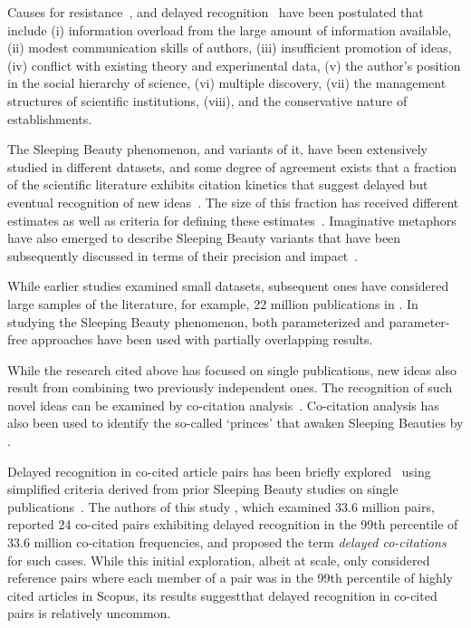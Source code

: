 \documentclass[utf8]{frontiersSCNS}
\begin{document}
Causes for resistance~\citep{Barber1961,Cole1970}, and delayed recognition~\citep{Garfield1970a,Garfield1980a} have been postulated  that include (i) information overload from the large amount of information available, (ii)  modest communication skills of authors, (iii) insufficient promotion of ideas, (iv) conflict with existing theory and experimental data, (v) the author's position in the social hierarchy of science, (vi)  multiple discovery, (vii) the management structures of scientific institutions, (viii), and the conservative nature of establishments. 

The Sleeping Beauty phenomenon, and variants of it, have been extensively studied in different datasets, and some degree of agreement exists that a fraction of the scientific literature exhibits citation kinetics that suggest delayed but eventual recognition of new ideas~\citep{Glanzel2003,redner_2005,Braun_2010,Li2014}. The size of this fraction has received different estimates as well as criteria for defining these estimates~\citep{Glanzel2004,Ke2015,Li2016,Raan2019}. Imaginative metaphors have also emerged to describe Sleeping Beauty variants that have been subsequently discussed in terms of their precision and impact~\citep{sugimoto_mostafa_2018}. 



While earlier studies examined small datasets, subsequent ones have considered large samples of the literature, for example, 22 million publications in \cite{Ke2015}. In studying the Sleeping Beauty phenomenon, both parameterized and parameter-free approaches have been used \citep{Raan2004, li_2014,Ke2015,costas2010,ye_bornmann_2018} with partially overlapping results.

While the research cited above has focused on single publications, new ideas also result from combining two previously independent ones. The recognition of such novel ideas can be examined by co-citation analysis~\citep{MarshakovaShaikevich1973,Uzzi2013,Boyack2014,Wang2017,Bradley2020}.  Co-citation analysis has also been used to identify the so-called `princes' that awaken Sleeping Beauties by \citep{zong_2018,teixeira2017sleeping} . 

Delayed recognition in co-cited article pairs has been briefly explored~\citep{devarakonda_2020} using simplified criteria derived from prior Sleeping Beauty studies on single publications~\citep{Ke2015,Raan2004,Raan2019}. The authors of this study \citep{devarakonda_2020}, which examined 33.6 million pairs, reported 24 co-cited pairs exhibiting delayed recognition in 
the 99th percentile of 33.6 million co-citation frequencies, and proposed the term \emph{delayed co-citations} for such cases. While this initial exploration, albeit at scale, only considered reference pairs 
where each member of a pair was in the 99th percentile of highly cited articles in Scopus, its results suggestthat delayed recognition in co-cited pairs is relatively uncommon. 
\end{document}
